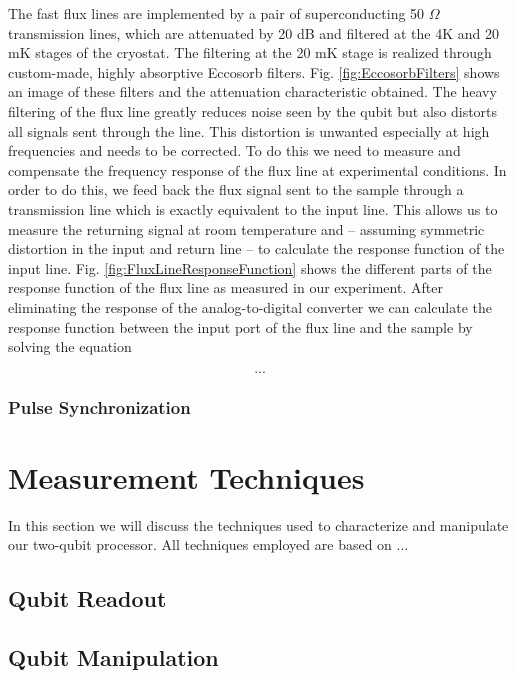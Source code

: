 The fast flux lines are implemented by a pair of superconducting 50 $\Omega$ transmission lines, which are attenuated by 20 dB and filtered at the 4K and 20 mK stages of the cryostat. The filtering at the 20 mK stage is realized through custom-made, highly absorptive Eccosorb filters. Fig. \ref{fig:EccosorbFilters} shows an image of these filters and the attenuation characteristic obtained. The heavy filtering of the flux line greatly reduces noise seen by the qubit but also distorts all signals sent through the line. This distortion is unwanted especially at high frequencies and needs to be corrected. To do this we need to measure and compensate the frequency response of the flux line at experimental conditions. In order to do this, we feed back the flux signal sent to the sample through a transmission line which is exactly equivalent to the input line. This allows us to measure the returning signal at room temperature and -- assuming symmetric distortion in the input and return line -- to calculate the response function of the input line. Fig. \ref{fig:FluxLineResponseFunction} shows the different parts of the response function of the flux line as measured in our experiment. After eliminating the response of the analog-to-digital converter we can calculate the response function between the input port of the flux line and the sample by solving the equation

\begin{equation}
...
\end{equation}

\subsection{Pulse Synchronization}

\chapter{Measurement Techniques}

In this section we will discuss the techniques used to characterize and manipulate our two-qubit processor. All techniques employed are based on ...

\section{Qubit Readout}

\section{Qubit Manipulation}

